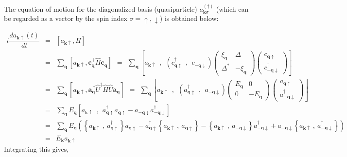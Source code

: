 \documentclass[uplatex,a4j,12pt,dvipdfmx]{jsarticle}
\begin{document}
The equation of motion for the diagonalized basis (quasiparticle) $a_{\bm{k} \sigma}^{(\dagger)}$
(which can be regarded as a vector by the spin index $\sigma=\uparrow,\downarrow$) is obtained below:

\begin{eqnarray}
	i \dfrac{d a_{\bm{k}\uparrow}(t)}{dt}
	&=&
	\left[ a_{\bm{k}\uparrow} , H \right]
	\nonumber \\[2mm] &=&
	\sum_{\bm{q}}
	\left[ a_{\bm{k}\uparrow} , \bm{c}_{\bm{q}}^{\ \dagger} \hat{H} \bm{c}_{\bm{q}} \right]
	\ \ = \ \
	\sum_{\bm{q}}
	\left[ a_{\bm{k}\uparrow} \ \ , \ \ \left( c_{\bm{q} \uparrow}^{\dagger} \ \ , \ \ c_{-\bm{q} \downarrow} \right)
		\!\!\!
		\left(
		\begin{array}{cc}
				\xi_{\bm{q}} & \Delta
				\\[3mm]
				\Delta^{*}   & - \xi_{\bm{q}}
			\end{array}
		\right)
		\!\!\!
		\left(
		\!\!
		\begin{array}{c}
				c_{\bm{q} \uparrow}
				\\[3mm]
				c_{-\bm{q} \downarrow}^{\dagger}
			\end{array}
		\!\!
		\right)
		\right]
	\nonumber \\[2mm] &=&
	\sum_{\bm{q}}
	\left[ a_{\bm{k}\uparrow} , \bm{a}_{\bm{q}}^{\ \dagger} \hat{U}^{\dagger} \hat{H} \hat{U} \bm{a}_{\bm{q}} \right]
	\ \ = \ \
	\sum_{\bm{q}}
	\left[ a_{\bm{k}\uparrow} \ \ , \ \ \left( a_{\bm{q} \uparrow}^{\dagger} \ \ , \ \ a_{-\bm{q} \downarrow} \right)
		\!\!\!
		\left(
		\begin{array}{cc}
				E_{\bm{q}} & 0
				\\[3mm]
				0          & - E_{\bm{q}}
			\end{array}
		\right)
		\!\!\!
		\left(
		\!\!
		\begin{array}{c}
				a_{\bm{q} \uparrow}
				\\[3mm]
				a_{-\bm{q} \downarrow}^{\dagger}
			\end{array}
		\!\!
		\right)
		\right]
	\nonumber \\[2mm] &=&
	\sum_{\bm{q}}
	E_{\bm{q}}
	\left[
		a_{\bm{k}\uparrow}
		\ \ , \ \
		a_{\bm{q} \uparrow}^{\dagger} a_{\bm{q} \uparrow} - a_{-\bm{q} \downarrow} a_{-\bm{q} \downarrow}^{\dagger}
		\right]
	\nonumber \\[2mm] &=&
	\sum_{\bm{q}}
	E_{\bm{q}}
	\left(
	\left\{ a_{\bm{k}\uparrow} \ , \ a_{\bm{q} \uparrow}^{\dagger} \right\} a_{\bm{q} \uparrow}
	-
	a_{\bm{q} \uparrow}^{\dagger} \left\{ a_{\bm{k}\uparrow} \ , \ a_{\bm{q} \uparrow} \right\}
	-
	\left\{ a_{\bm{k}\uparrow} \ , \ a_{-\bm{q} \downarrow} \right\} a_{-\bm{q} \downarrow}^{\dagger}
	+
	a_{-\bm{q} \downarrow}  \left\{ a_{\bm{k}\uparrow} \ , \ a_{-\bm{q} \downarrow}^{\dagger} \right\}
	\right)
	\nonumber \\[2mm] &=&
	E_{\bm{k}}
	a_{\bm{k} \uparrow}
\end{eqnarray}
%
Integrating this gives,
\end{document}

